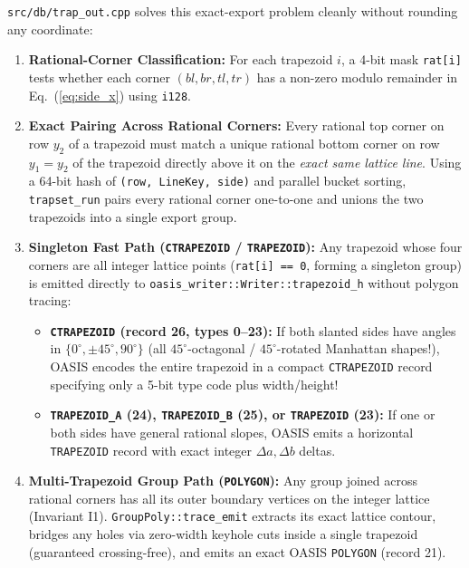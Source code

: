 \texttt{src/db/trap\_out.cpp} solves this exact-export problem cleanly without rounding any coordinate:
\begin{enumerate}
  \item \textbf{Rational-Corner Classification:} For each trapezoid $i$, a 4-bit mask \texttt{rat[i]} tests whether each corner $(bl, br, tl, tr)$ has a non-zero modulo remainder in Eq.~(\ref{eq:side_x}) using \texttt{i128}.
  \item \textbf{Exact Pairing Across Rational Corners:} Every rational top corner on row $y_2$ of a trapezoid must match a unique rational bottom corner on row $y_1 = y_2$ of the trapezoid directly above it on the \emph{exact same lattice line}. Using a 64-bit hash of \texttt{(row, LineKey, side)} and parallel bucket sorting, \texttt{trapset\_run} pairs every rational corner one-to-one and unions the two trapezoids into a single export group.
  \item \textbf{Singleton Fast Path (\texttt{CTRAPEZOID} / \texttt{TRAPEZOID}):} Any trapezoid whose four corners are all integer lattice points (\texttt{rat[i] == 0}, forming a singleton group) is emitted directly to \texttt{oasis\_writer::Writer::trapezoid\_h} without polygon tracing:
  \begin{itemize}
    \item \textbf{\texttt{CTRAPEZOID} (record 26, types 0--23):} If both slanted sides have angles in $\{0^\circ, \pm 45^\circ, 90^\circ\}$ (all $45^\circ$-octagonal / $45^\circ$-rotated Manhattan shapes!), OASIS encodes the entire trapezoid in a compact \texttt{CTRAPEZOID} record specifying only a 5-bit type code plus width/height!
    \item \textbf{\texttt{TRAPEZOID\_A} (24), \texttt{TRAPEZOID\_B} (25), or \texttt{TRAPEZOID} (23):} If one or both sides have general rational slopes, OASIS emits a horizontal \texttt{TRAPEZOID} record with exact integer $\Delta a, \Delta b$ deltas.
  \end{itemize}
  \item \textbf{Multi-Trapezoid Group Path (\texttt{POLYGON}):} Any group joined across rational corners has all its outer boundary vertices on the integer lattice (Invariant I1). \texttt{GroupPoly::trace\_emit} extracts its exact lattice contour, bridges any holes via zero-width keyhole cuts inside a single trapezoid (guaranteed crossing-free), and emits an exact OASIS \texttt{POLYGON} (record 21).
\end{enumerate}

